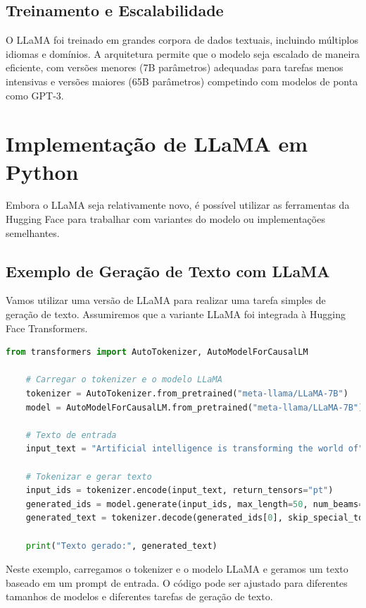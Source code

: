 \documentclass[14pt,a4paper,oneside]{book}
\begin{document}
\subsection{Treinamento e Escalabilidade}

O LLaMA foi treinado em grandes corpora de dados textuais, incluindo múltiplos idiomas e domínios. A arquitetura permite que o modelo seja escalado de maneira eficiente, com versões menores (7B parâmetros) adequadas para tarefas menos intensivas e versões maiores (65B parâmetros) competindo com modelos de ponta como GPT-3.

\section{Implementação de LLaMA em Python}

Embora o LLaMA seja relativamente novo, é possível utilizar as ferramentas da Hugging Face para trabalhar com variantes do modelo ou implementações semelhantes.

\subsection{Exemplo de Geração de Texto com LLaMA}

Vamos utilizar uma versão de LLaMA para realizar uma tarefa simples de geração de texto. Assumiremos que a variante LLaMA foi integrada à Hugging Face Transformers.

\begin{lstlisting}[language=Python]
	from transformers import AutoTokenizer, AutoModelForCausalLM
	
	# Carregar o tokenizer e o modelo LLaMA
	tokenizer = AutoTokenizer.from_pretrained("meta-llama/LLaMA-7B")
	model = AutoModelForCausalLM.from_pretrained("meta-llama/LLaMA-7B")
	
	# Texto de entrada
	input_text = "Artificial intelligence is transforming the world of"
	
	# Tokenizar e gerar texto
	input_ids = tokenizer.encode(input_text, return_tensors="pt")
	generated_ids = model.generate(input_ids, max_length=50, num_beams=5, early_stopping=True)
	generated_text = tokenizer.decode(generated_ids[0], skip_special_tokens=True)
	
	print("Texto gerado:", generated_text)
\end{lstlisting}

Neste exemplo, carregamos o tokenizer e o modelo LLaMA e geramos um texto baseado em um prompt de entrada. O código pode ser ajustado para diferentes tamanhos de modelos e diferentes tarefas de geração de texto.
\end{document}
